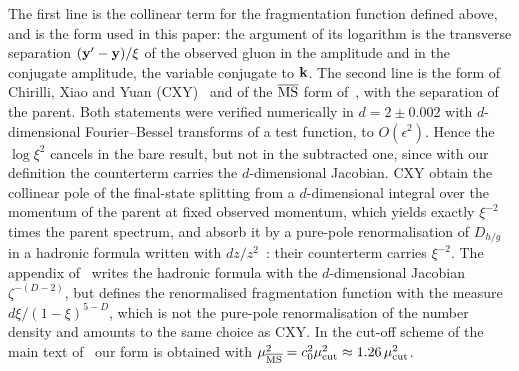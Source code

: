 The first line is the collinear term for the fragmentation function defined above, and is the form used in this paper: the argument of its logarithm is the transverse separation $(\mathbf{y}'-\mathbf{y})/\xi$ of the observed gluon in the amplitude and in the conjugate amplitude, the variable conjugate to $\mathbf{k}$. The second line is the form of Chirilli, Xiao and Yuan (CXY)~\cite{Chirilli:2011km,Chirilli:2012jd} and of the $\overline{\rm MS}$ form of~\cite{Altinoluk:2014eka}, with the separation of the parent. Both statements were verified numerically in $d=2\pm0.002$ with $d$-dimensional Fourier--Bessel transforms of a test function, to $O(\epsilon^2)$. Hence the $\log\xi^2$ cancels in the bare result, but not in the subtracted one, since with our definition the counterterm carries the $d$-dimensional Jacobian. CXY obtain the collinear pole of the final-state splitting from a $d$-dimensional integral over the momentum of the parent at fixed observed momentum, which yields exactly $\xi^{-2}$ times the parent spectrum, and absorb it by a pure-pole renormalisation of $D_{h/g}$ in a hadronic formula written with $dz/z^2$~\cite{Chirilli:2012jd}: their counterterm carries $\xi^{-2}$. The appendix of~\cite{Altinoluk:2014eka} writes the hadronic formula with the $d$-dimensional Jacobian $\zeta^{-(D-2)}$, but defines the renormalised fragmentation function with the measure $d\xi/(1-\xi)^{5-D}$, which is not the pure-pole renormalisation of the number density and amounts to the same choice as CXY. In the cut-off scheme of the main text of~\cite{Altinoluk:2014eka} our form is obtained with $\mu^2_{\overline{\rm MS}}=c_0^2\mu^2_{\rm cut}\approx1.26\,\mu^2_{\rm cut}$.

